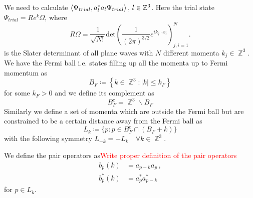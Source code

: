 \documentclass[sn-mathphys,Numbered, a4paper ,nocrop]{sn-jnl}%
\DeclareMathOperator{\Z}{\mathbb{Z}}
\theoremstyle{plain}
\theoremstyle{definition}
\theoremstyle{remark}
\theoremstyle{plain}
\theoremstyle{definition}
\theoremstyle{remark}
\begin{document}
We need to calculate $\braket{\Psi_{trial},a^*_la_l\Psi_{trial}},\, l\in\mathbb{Z}^3$. Here the trial state $\Psi_{trial}= Re^k\Omega$, where 
\begin{equation}
    R\Omega = \frac{1}{\sqrt{N!}}\text{det}\left(\frac{1}{(2\pi)^{3/2}}e^{ik_j\cdot x_i}\right)^N_{j,i=1}.
\end{equation}
is the Slater determinant of all plane waves with $N$ different momenta $k_j \in \Z^3$.
We have the Fermi ball i.e. states filling up all the momenta up to Fermi momentum as
\begin{equation}
    B_F\coloneq\left\{k\in \Z^3 : |k|\leq k_F\right\}
\end{equation}
for some $k_F>0$ and we define its complement as 
\begin{equation}
    B_F^c=\Z^3\backslash B_F
\end{equation}
Similarly we define a set of momenta which are outside the Fermi ball but are constrained to be a certain distance away from the Fermi ball as 
\begin{equation}
    L_k\coloneq \{p :p\in B_F^c \cap (B_F + k)\}
\end{equation}
with the following symmetry $L_{-k}=-L_k \quad\forall k \in \Z^3$.

We define the pair operators as\textcolor{red}{Write proper definition of the pair operators}
\begin{align}
    b_p(k) &= a_{p-k}a_{p}\,,\\
    b^*_p(k) &= a^*_{p}a^*_{p-k}
\end{align}
for $p\in L_k$.\newline
\end{document}
